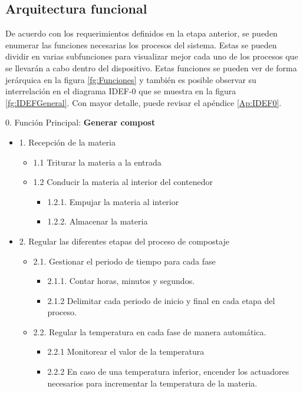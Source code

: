 \subsection{Arquitectura funcional}
De acuerdo con los requerimientos definidos en la etapa anterior, se pueden enumerar las funciones necesarias los procesos del sistema. Estas se pueden dividir en varias subfunciones para visualizar mejor cada uno de los procesos que se llevarán a cabo dentro del dispositivo. Estas funciones se pueden ver de forma jerárquica en la figura \ref{fg:Funciones} y también es posible observar su interrelación en el diagrama IDEF-0 que se muestra en la figura \ref{fg:IDEFGeneral}. Con mayor detalle, puede revisar el apéndice \ref{Ap:IDEF0}.

0. Función Principal: \textbf{Generar compost }
\begin{itemize}
    \item 1. Recepción de la materia
    \begin{itemize}
        \item 1.1 Triturar la materia a la entrada
        \item 1.2 Conducir la materia al interior del contenedor
        \begin{itemize}
            \item 1.2.1. Empujar la materia al interior
            \item 1.2.2. Almacenar la materia
        \end{itemize}
    \end{itemize}
    \item 2. Regular las diferentes etapas del proceso de compostaje
    \begin{itemize}
        \item 2.1. Gestionar el periodo de tiempo para cada fase
        \begin{itemize}
            \item 2.1.1. Contar horas, minutos y segundos.
            \item 2.1.2 Delimitar cada periodo de inicio y final en cada etapa del proceso.
        \end{itemize}
        \item 2.2. Regular la temperatura en cada fase de manera automática.
        \begin{itemize}
            \item 2.2.1 Monitorear el valor de la temperatura
            \item 2.2.2 En caso de una temperatura inferior, encender los actuadores necesarios para incrementar la temperatura de la materia.

\end{itemize}
\end{itemize}
\end{itemize}
